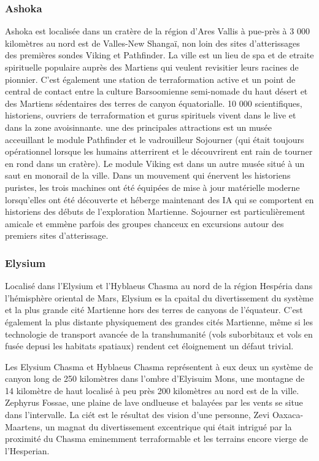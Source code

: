 \subsubsection{Ashoka} \label{sec:ashoka} 

Ashoka est localisée dans un cratère de la région d'Ares Vallis à pue-près à 3 000 kilomètres au nord est de Valles-New Shangaï, non loin des sites d'atterissages des premières sondes Viking et Pathfinder. La ville est un lieu de spa et de etraite spirituelle populaire auprès des Martiens qui veulent revisitier leurs racines de pionnier. C'est également une station de terraformation active et un point de central de contact entre la culture Barsoomienne semi-nomade du haut désert et des Martiens sédentaires des terres de canyon équatorialle. 10 000 scientifiques, historiens, ouvriers de terraformation et gurus spirituels vivent dans le live et dans la zone avoisinnante. une des principales attractions est un musée acceuillant le module Pathfinder et le vadrouilleur Sojourner (qui était toujours opérationnel lorsque les humains atterrirent et le découvrirent ent rain de tourner en rond dans un cratère). Le module Viking est dans un autre musée situé à un saut en monorail de la ville. Dans un mouvement qui énervent les historiens puristes, les trois machines ont été équipées de mise à jour matérielle moderne lorsqu'elles ont été découverte et héberge maintenant des IA qui se comportent en historiens des débuts de l'exploration Martienne. Sojourner est particulièrement amicale et emmène parfois des groupes chanceux en excursions autour des premiers sites d'atterissage. 

\subsubsection{Elysium} \label{sec:elysium} 

Localisé dans l'Elysium et l'Hyblaeus Chasma au nord de la région Hespéria dans l'hémisphère oriental de Mars, Elysium es la cpaital du divertissement du système et la plus grande cité Martienne hors des terres de canyons de l'équateur. C'est également la plus distante physiquement des grandes cités Martienne, même si les technologie de transport avancée de la transhumanité (vols suborbitaux et vols en fusée depusi les habitats spatiaux) rendent cet éloignement un défaut trivial. 

Les Elysium Chasma et Hyblaeus Chasma représentent à eux deux un système de canyon long de 250 kilomètres dans l'ombre d'Elyisuim Mons, une montagne de 14 kilomètre de haut localisé à peu près 200 kilomètres au nord est de la ville. Zephyrus Fossae, une plaine de lave ondlueuse et balayées par les vents se situe dans l'intervalle. La ciét est le résultat des vision d'une personne, Zevi Oaxaca-Maartens, un magnat du divertissement excentrique qui était intrigué par la proximité du Chasma eminemment terraformable et les terrains encore vierge de l'Hesperian. 

